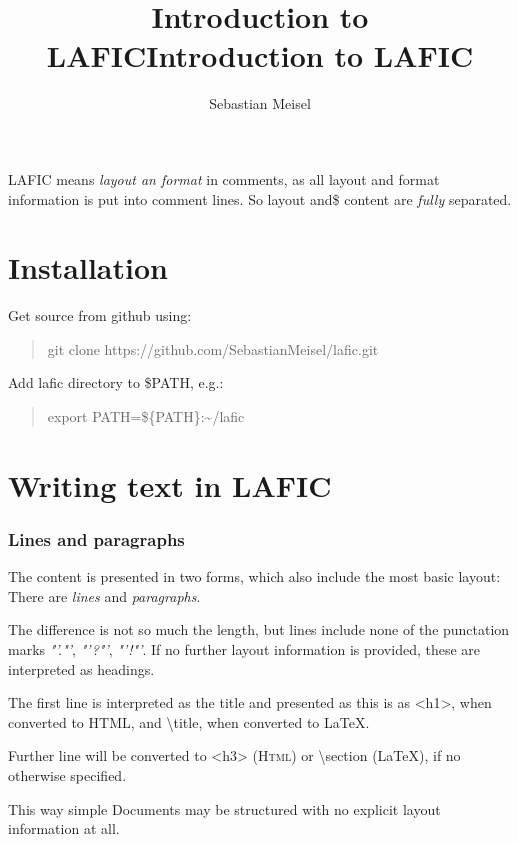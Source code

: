 \documentclass{article}
\title{Introduction to LAFIC}
\title{Introduction to LAFIC}
\author{Sebastian Meisel}
\begin{document}
\maketitle


LAFIC means \emph{layout an format} in comments, as all layout and
format information is put into comment lines. So layout and\$
content are \emph{fully} separated.

\part{Installation}

Get source from github using:

\begin{quote}
git clone https://github.com/SebastianMeisel/lafic.git

\end{quote}

Add lafic directory to \$PATH, e.g.:

\begin{quote}
export PATH=\$\{PATH\}:\textasciitilde/lafic

\end{quote}

\part{Writing text in LAFIC}

\section{Lines and paragraphs}

The content is presented in two forms, which also include
the most basic layout: There are \emph{lines} and \emph{paragraphs}.

The difference is not so much the length, but lines include
none of the punctation marks \emph{"'."'}, \emph{"'?"'}, \emph{"'!"'}. If no further layout
information is provided, these are interpreted as headings.

The first line is interpreted as the title and presented as
this is as <h1>, when converted to HTML, and \textbackslash title, when 
converted to LaTeX.

Further line will be converted to <h3> (\textsc{Html}) or \textbackslash section
(LaTeX), if no otherwise specified.

This way simple Documents may be structured with no explicit
layout information at all.
\end{document}
